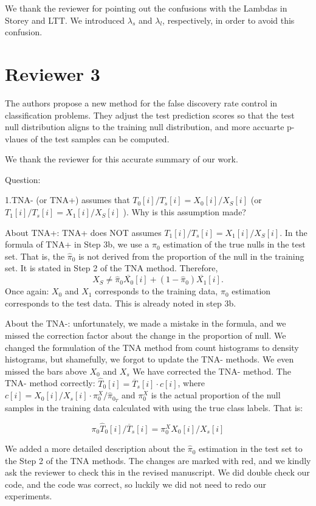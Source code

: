 \documentclass{article}
\newcommand{\response}[1]{\vspace*{1ex} \color{blue} \noindent #1 \color{black}
\vspace*{2ex}}
\begin{document}
\response{We thank the reviewer for pointing out the confusions with the Lambdas in Storey and LTT. We introduced $\lambda_s$ and $\lambda_l$, respectively, in order to avoid this confusion.}

\clearpage

\section*{Reviewer 3}

The authors propose a new method for the false discovery rate control in classification problems. They adjust the test prediction scores so that the test null distribution
aligns to the training null distribution, and more accuarte p-vlaues of the test samples can be computed.

\response{We thank the reviewer for this accurate summary of our work.}

Question:

1.TNA- (or TNA+) assumes that $T_0[i]/T_s[i]= X_0[i]/X_S[i]$ (or $T_1[i]/T_s[i]= X_1[i]/X_S[i]$ ). Why is this assumption made? 

\response{About TNA+: TNA+ does NOT assumes $T_1[i]/T_s[i]= X_1[i]/X_S[i]$. In the formula of TNA+ in Step 3b, we use a $\pi_0$ estimation of the true nulls in the test set. That is, the $\hat{\pi}_0$ is not derived from the proportion of the null in the training set. It is stated in Step 2 of the TNA method. Therefore,  $$X_S \ne  \hat{\pi}_0 \overline{X_0}[i] + (1-\hat{\pi}_0) \overline{X_1}[i].$$ 
Once again: $X_0$ and $X_1$ corresponds to the training data, $\pi_0$ estimation corresponds to the test data. This is already noted in step 3b.
	
	
About the TNA-: unfortunately, we made a mistake in the formula, and we missed the correction factor about the change in the proportion of null. We changed the formulation of the TNA method from count histograms to density histograms,  but shamefully, we forgot to update the TNA- methods. We even missed the bars above $X_0$ and $X_s$ We have corrected the TNA- method. The TNA- method correctly: $\hat{T}_0[i] = \overline{T}_s[i]\cdot c[i]$, where  $c[i]=X_0[i]/X_s[i]\cdot \pi^{X}_{0}/\hat{\pi}_{0_T}$ and $\pi^{X}_{0}$ is the actual proportion of the null samples in the training data calculated with using the true class labels. That is:

$$\pi_0\hat{T}_0[i] /\overline{T}_s[i]= \pi^{X}_{0} X_0[i]/X_s[i]$$

We added a more detailed description about the  $\hat{\pi}_0$ estimation in the test set to the Step 2 of the TNA methods. The changes are marked with red, and we kindly ask the reviewer to check this in the revised manuscript. We did double check our code, and the code was correct, so luckily we did not need to redo our experiments.}
\end{document}
